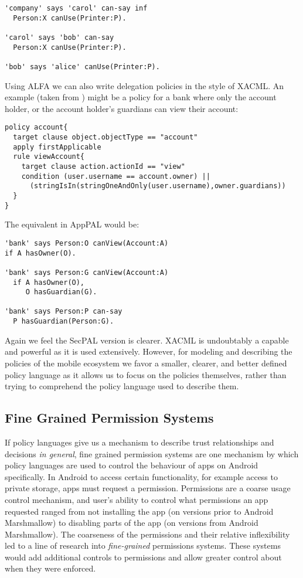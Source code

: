 \documentclass[thesis.tex]{subfiles}
\begin{document}
\begin{lstlisting}
'company' says 'carol' can-say inf
  Person:X canUse(Printer:P).

'carol' says 'bob' can-say
  Person:X canUse(Printer:P).

'bob' says 'alice' canUse(Printer:P).
\end{lstlisting}

Using ALFA we can also write delegation policies in the style of
XACML.  An example (taken from \cite{axiomatics_going_2016}) might be
a policy for a bank where only the account holder, or the account
holder's guardians can view their account:

\begin{lstlisting}
policy account{ 
  target clause object.objectType == "account"
  apply firstApplicable
  rule viewAccount{ 
    target clause action.actionId == "view"
    condition (user.username == account.owner) ||
      (stringIsIn(stringOneAndOnly(user.username),owner.guardians))
  }
}
\end{lstlisting}

The equivalent in AppPAL would be:

\begin{lstlisting}
'bank' says Person:O canView(Account:A)
if A hasOwner(O).

'bank' says Person:G canView(Account:A)
  if A hasOwner(O),
     O hasGuardian(G).

'bank' says Person:P can-say
  P hasGuardian(Person:G).
\end{lstlisting}

Again we feel the SecPAL version is clearer.  XACML is undoubtably a
capable and powerful as it is used extensively.  However, for modeling
and describing the policies of the mobile ecosystem we favor a
smaller, clearer, and better defined policy language as it allows us
to focus on the policies themselves, rather than trying to comprehend
the policy language used to describe them.

\subsection{Fine Grained Permission Systems}

If policy languages give us a mechanism to describe trust
relationships and decisions \emph{in general}, fine grained permission
systems are one mechanism by which policy languages are used to
control the behaviour of apps on Android specifically.  In Android to
access certain functionality, for example access to private storage,
apps must request a permission.  Permissions are a coarse usage
control mechanism, and user's ability to control what permissions an
app requested ranged from not installing the app (on versions prior to
Android Marshmallow) to disabling parts of the app (on versions from
Android Marshmallow).  The coarseness of the permissions and their
relative inflexibility led to a line of research into
\emph{fine-grained} permissions systems.  These systems would add
additional controls to permissions and allow greater control about
when they were enforced.
\end{document}
